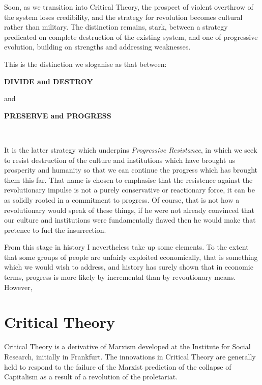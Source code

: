 \documentclass[10pt,titlepage]{article}
\begin{document}
Soon, as we transition into Critical Theory, the prospect of violent overthrow of the system loses credibility, and the strategy for revolution becomes cultural rather than military.
The distinction remains, stark, between a strategy predicated on complete destruction of the existing system, and one of progressive evolution, building on strengths and addressing weaknesses.

This is the distinction we sloganise as that between:

\begin{minipage}[t]{0.8\linewidth}

\begin{centering}
\vspace{0.1in}
       {\bf DIVIDE and DESTROY}
       
\vspace{0.1in}
and

\vspace{0.1in}
       {\bf PRESERVE and PROGRESS}
       
\vspace{0.1in}
\        
\end{centering}
\end{minipage}


It is the latter strategy which underpins \emph{Progressive Resistance}, in which we seek to resist destruction of the culture and institutions which have brought us prosperity and humanity so that we can continue the progress which has brought them this far.
That name is chosen to emphasise that the resistence against the revolutionary impulse is not a purely conservative or reactionary force, it can be as solidly rooted in a commitment to progress.
Of course, that is not how a revolutionary would speak of these things, if he were not already convinced that our culture and institutions were fundamentally flawed then he would make that pretence to fuel the insurrection.

From this stage in history I nevertheless take up some elements.
To the extent that some groups of people are unfairly exploited economically, that is something which we would wish to address, and history has surely shown that in economic terms, progress is more likely by incremental than by revoutionary means.
However, 


\section{Critical Theory}

Critical Theory is a derivative of Marxism developed at the Institute for Social Research, initially in Frankfurt.
The innovations in Critical Theory are generally held to respond to the failure of the Marxist prediction of the collapse of Capitalism as a result of a revolution of the proletariat.
\end{document}
